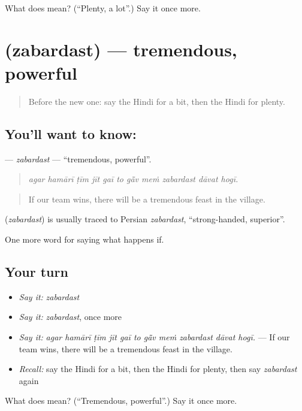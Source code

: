 \begin{tcolorbox}[breakable,colback=teal!4,colframe=teal!35!black,title={Before you move on}]
What does  mean? (\textquotedblleft{}Plenty, a lot\textquotedblright{}.) Say it once more.
\end{tcolorbox}
\section[\texorpdfstring{\hi{ज़बरदस्त} (zabardast)}{ज़बरदस्त (zabardast)}]{ (zabardast) — tremendous, powerful}

\label{lesson:HI-C387-zabardast}



\begin{quote}
Before the new one: say the Hindi for a bit, then the Hindi for plenty.
\end{quote}

\subsection*{You'll want to know: }
\textbf{} — \emph{zabardast} — \textquotedblleft{}tremendous, powerful\textquotedblright{}.

\begin{quote}
          
\end{quote}

\begin{quote}
\emph{agar hamārī ṭīm jīt gaī to gā̃v meṁ zabardast dāvat hogī.}
\end{quote}

\begin{quote}
If our team wins, there will be a tremendous feast in the village.
\end{quote}

\begin{cousinweb}
\textbf{} (\emph{zabardast}) is usually traced to Persian \emph{zabardast}, \textquotedblleft{}strong-handed, superior\textquotedblright{}.
\end{cousinweb}

\begin{grammarlens}[title={What you've built}]
One more word for saying what happens if.
\end{grammarlens}

\subsection*{Your turn}
\begin{itemize}
\raggedright
  \item \emph{Say it:} \emph{zabardast}
  \item \emph{Say it:} \emph{zabardast}, once more
  \item \emph{Say it:} \emph{agar hamārī ṭīm jīt gaī to gā̃v meṁ zabardast dāvat hogī.} — If our team wins, there will be a tremendous feast in the village.
  \item \emph{Recall:} say the Hindi for a bit, then the Hindi for plenty, then say \emph{zabardast} again
\end{itemize}

\begin{tcolorbox}[breakable,colback=teal!4,colframe=teal!35!black,title={Before you move on}]
What does  mean? (\textquotedblleft{}Tremendous, powerful\textquotedblright{}.) Say it once more.
\end{tcolorbox}
